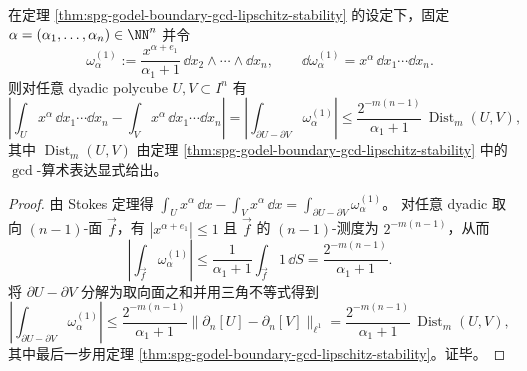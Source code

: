 \begin{corollary}\label{cor:spg-godel-moment-robust-gcd-bound}
在定理 \ref{thm:spg-godel-boundary-gcd-lipschitz-stability} 的设定下，固定 \(\alpha=(\alpha_1,\dots,\alpha_n)\in\NN^n\) 并令
\[
\omega_{\alpha}^{(1)}:=\frac{x^{\alpha+e_1}}{\alpha_1+1}\,\dd x_2\wedge\cdots\wedge \dd x_n,
\qquad
\dd\omega_{\alpha}^{(1)}=x^\alpha\,\dd x_1\cdots\dd x_n.
\]
则对任意 dyadic polycube \(U,V\subset I^n\) 有
\[
\left|\int_U x^\alpha\,\dd x_1\cdots\dd x_n-\int_V x^\alpha\,\dd x_1\cdots\dd x_n\right|
=\left|\int_{\partial U-\partial V}\omega_{\alpha}^{(1)}\right|
\le \frac{2^{-m(n-1)}}{\alpha_1+1}\,\operatorname{Dist}_m(U,V),
\]
其中 \(\operatorname{Dist}_m(U,V)\) 由定理 \ref{thm:spg-godel-boundary-gcd-lipschitz-stability} 中的 \(\gcd\)-算术表达显式给出。
\end{corollary}
\begin{proof}
由 Stokes 定理得
\(
\int_U x^\alpha\,\dd x-\int_V x^\alpha\,\dd x=\int_{\partial U-\partial V}\omega_{\alpha}^{(1)}
\)。
对任意 dyadic 取向 \((n-1)\)-面 \(\vec f\)，有 \(|x^{\alpha+e_1}|\le 1\) 且 \(\vec f\) 的 \((n-1)\)-测度为 \(2^{-m(n-1)}\)，从而
\[
\left|\int_{\vec f}\omega_{\alpha}^{(1)}\right|
\le \frac{1}{\alpha_1+1}\int_{\vec f}1\,\dd S
=\frac{2^{-m(n-1)}}{\alpha_1+1}.
\]
将 \(\partial U-\partial V\) 分解为取向面之和并用三角不等式得到
\[
\left|\int_{\partial U-\partial V}\omega_{\alpha}^{(1)}\right|
\le \frac{2^{-m(n-1)}}{\alpha_1+1}\bigl\|\partial_n[U]-\partial_n[V]\bigr\|_{\ell^1}
=\frac{2^{-m(n-1)}}{\alpha_1+1}\,\operatorname{Dist}_m(U,V),
\]
其中最后一步用定理 \ref{thm:spg-godel-boundary-gcd-lipschitz-stability}。证毕。
\end{proof}

